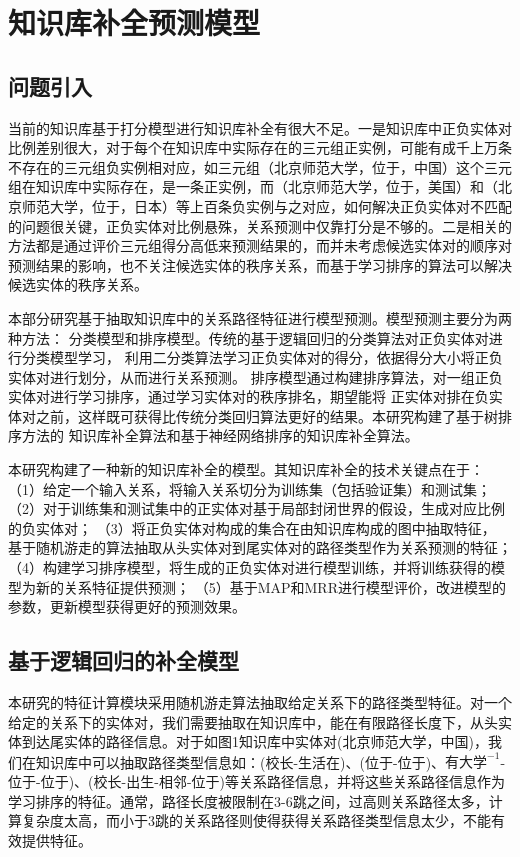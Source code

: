 

\chapter{知识库补全预测模型}
\label{cha:kbc-rank}


\section{问题引入}
当前的知识库基于打分模型进行知识库补全有很大不足。一是知识库中正负实体对比例差别很大，对于每个在知识库中实际存在的三元组正实例，可能有成千上万条不存在的三元组负实例相对应，如三元组（北京师范大学，位于，中国）这个三元组在知识库中实际存在，是一条正实例，而（北京师范大学，位于，美国）和（北京师范大学，位于，日本）等上百条负实例与之对应，如何解决正负实体对不匹配的问题很关键，正负实体对比例悬殊，关系预测中仅靠打分是不够的。二是相关的方法都是通过评价三元组得分高低来预测结果的，而并未考虑候选实体对的顺序对预测结果的影响，也不关注候选实体的秩序关系，而基于学习排序的算法可以解决候选实体的秩序关系。

本部分研究基于抽取知识库中的关系路径特征进行模型预测。模型预测主要分为两种方法：
分类模型和排序模型。传统的基于逻辑回归的分类算法对正负实体对进行分类模型学习，
利用二分类算法学习正负实体对的得分，依据得分大小将正负实体对进行划分，从而进行关系预测。
排序模型通过构建排序算法，对一组正负实体对进行学习排序，通过学习实体对的秩序排名，期望能将
正实体对排在负实体对之前，这样既可获得比传统分类回归算法更好的结果。本研究构建了基于树排序方法的
知识库补全算法和基于神经网络排序的知识库补全算法。

本研究构建了一种新的知识库补全的模型。其知识库补全的技术关键点在于：
（1）给定一个输入关系，将输入关系切分为训练集（包括验证集）和测试集；
（2）对于训练集和测试集中的正实体对基于局部封闭世界的假设，生成对应比例的负实体对；
（3）将正负实体对构成的集合在由知识库构成的图中抽取特征，
基于随机游走的算法抽取从头实体对到尾实体对的路径类型作为关系预测的特征；
（4）构建学习排序模型，将生成的正负实体对进行模型训练，并将训练获得的模型为新的关系特征提供预测；
（5）基于MAP和MRR进行模型评价，改进模型的参数，更新模型获得更好的预测效果。

\section{基于逻辑回归的补全模型}

本研究的特征计算模块采用随机游走算法抽取给定关系下的路径类型特征。对一个给定的关系下的实体对，我们需要抽取在知识库中，能在有限路径长度下，从头实体到达尾实体的路径信息。对于如图1知识库中实体对(北京师范大学，中国)，我们在知识库中可以抽取路径类型信息如：(校长-生活在)、(位于-位于)、${有大学}^{-1}$-位于-位于)、(校长-出生-相邻-位于)等关系路径信息，并将这些关系路径信息作为学习排序的特征。通常，路径长度被限制在3-6跳之间，过高则关系路径太多，计算复杂度太高，而小于3跳的关系路径则使得获得关系路径类型信息太少，不能有效提供特征。

